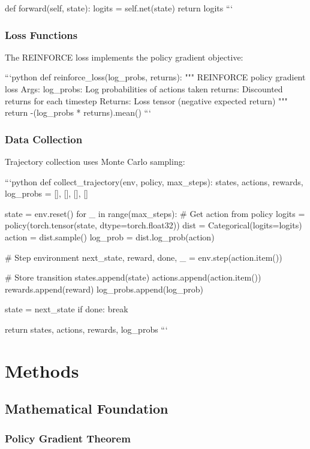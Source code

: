 \documentclass{article}
\begin{document}
    def forward(self, state):
        logits = self.net(state)
        return logits
```

\subsubsection{Loss Functions}
The REINFORCE loss implements the policy gradient objective:

```python
def reinforce_loss(log_probs, returns):
    """
    REINFORCE policy gradient loss
    Args:
        log_probs: Log probabilities of actions taken
        returns: Discounted returns for each timestep
    Returns:
        Loss tensor (negative expected return)
    """
    return -(log_probs * returns).mean()
```

\subsubsection{Data Collection}
Trajectory collection uses Monte Carlo sampling:

```python
def collect_trajectory(env, policy, max_steps):
    states, actions, rewards, log_probs = [], [], [], []

    state = env.reset()
    for _ in range(max_steps):
        # Get action from policy
        logits = policy(torch.tensor(state, dtype=torch.float32))
        dist = Categorical(logits=logits)
        action = dist.sample()
        log_prob = dist.log_prob(action)

        # Step environment
        next_state, reward, done, _ = env.step(action.item())

        # Store transition
        states.append(state)
        actions.append(action.item())
        rewards.append(reward)
        log_probs.append(log_prob)

        state = next_state
        if done:
            break

    return states, actions, rewards, log_probs
```

\section{Methods}

\subsection{Mathematical Foundation}

\subsubsection{Policy Gradient Theorem}
\end{document}
